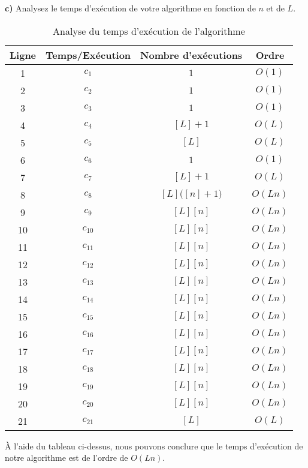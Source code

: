 \documentclass[devoir3.tex]{subfiles}
\begin{document}
\newpage

\textbf{c)} Analysez le temps d’exécution de votre algorithme en fonction de \(n\)
et de \(L\). \\
\begin{table}[H]
	\centering
	\caption{Analyse du temps d'exécution de l'algorithme}
	\vspace{0.5cm}
	\begin{tabular}{|c|c|c|c|}
		\hline
		Ligne & Temps/Exécution & Nombre d'exécutions & Ordre \\ \hline
		1     & \(c_1\)            & \(1\)                   & \(O(1)\)       \\ \hline
		2     & \(c_2\)            & \(1\)                   & \(O(1)\)       \\ \hline
		3     & \(c_3\)            & \(1\)                   & \(O(1)\)       \\ \hline
		4     & \(c_4\)            & \([L]+1\)               & \(O(L)\)     \\ \hline
		5     & \(c_5\)            & \([L]\)                 & \(O(L)\)       \\ \hline
		6     & \(c_6\)            & \(1\)                   & \(O(1)\)       \\ \hline
		7     & \(c_7\)            & \([L]+1\)               & \(O(L)\)       \\ \hline
		8     & \(c_8\)            & \([L]\big([n]+1\big)\)  & \(O(Ln)\)      \\ \hline
		9     & \(c_9\)            & \([L][n]\)              & \(O(Ln)\)      \\ \hline
		10    & \(c_10\)           & \([L][n]\)              & \(O(Ln)\)      \\ \hline
		11    & \(c_11\)           & \([L][n]\)              & \(O(Ln)\)      \\ \hline
		12    & \(c_{12}\)         & \([L][n]\)              & \(O(Ln)\)      \\ \hline
		13    & \(c_{13}\)         & \([L][n]\)              & \(O(Ln)\)      \\ \hline
		14    & \(c_{14}\)         & \([L][n]\)              & \(O(Ln)\)      \\ \hline
		15    & \(c_{15}\)         & \([L][n]\)              & \(O(Ln)\)      \\ \hline
		16    & \(c_{16}\)         & \([L][n]\)              & \(O(Ln)\)      \\ \hline
		17    & \(c_{17}\)         & \([L][n]\)              & \(O(Ln)\)      \\ \hline
		18    & \(c_{18}\)         & \([L][n]\)              & \(O(Ln)\)      \\ \hline
		19    & \(c_{19}\)         & \([L][n]\)              & \(O(Ln)\)      \\ \hline
		20    & \(c_{20}\)         & \([L][n]\)              & \(O(Ln)\)      \\ \hline
		21    & \(c_{21}\)         & \([L]\)                 & \(O(L)\)       \\ \hline
	\end{tabular}
\end{table}

À l'aide du tableau ci-dessus, nous pouvons conclure que le temps d'exécution de notre algorithme est de l'ordre de \(O(Ln)\).
\end{document}
